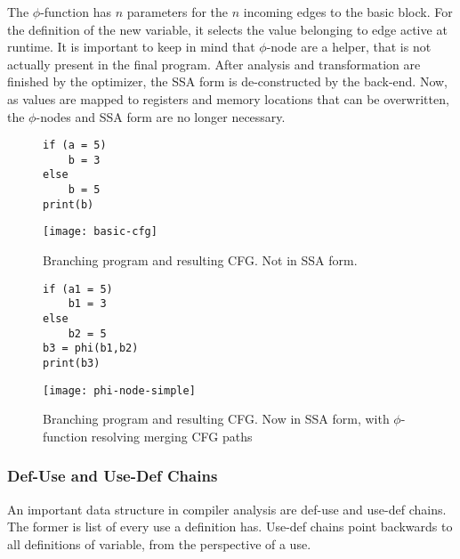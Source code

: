 The $\phi$-function has $n$ parameters for the $n$ incoming edges to the basic block. For the definition of the new variable, it selects
the value belonging to edge active at runtime. It is important to keep in mind that $\phi$-node are a helper, that is not
actually present in the final program. After analysis and transformation are finished by the optimizer, the SSA form is de-constructed
by the back-end. Now, as values are mapped to registers and memory locations that can be overwritten, the $\phi$-nodes and SSA form are no longer necessary.
\cite{Rastello:2016:SCD:3002539}

\begin{figure}[t]
	\begin{minipage}{0.4\textwidth}
		\begin{lstlisting}[style=c]
if (a = 5)
	b = 3
else
	b = 5
print(b)
		\end{lstlisting}
	\end{minipage}\hfill
	\begin{minipage} {0.45\textwidth}
			\texttt{[image: basic-cfg]}
	\end{minipage}
\caption{Branching program and resulting CFG. Not in SSA form.}
\label{simple-cfg}
\end{figure}
\begin{figure}[t]
	\begin{minipage}{0.4\textwidth}
		\begin{lstlisting}[style=c]
if (a1 = 5)
	b1 = 3
else
	b2 = 5
b3 = phi(b1,b2)
print(b3)
		\end{lstlisting}
	\end{minipage}\hfill
	\begin{minipage} {0.45\textwidth}
		\texttt{[image: phi-node-simple]}
	\end{minipage}
	\caption{Branching program and resulting CFG. Now in SSA form, with $\phi$-function resolving merging CFG paths}
	\label{simple-phi}
\end{figure}
\subsubsection{Def-Use and Use-Def Chains}
An important data structure in compiler analysis are def-use and use-def chains. The former is list of every use a definition has. Use-def chains point backwards to all definitions of variable, from the perspective of a use.  
\cite{Rastello:2016:SCD:3002539}

